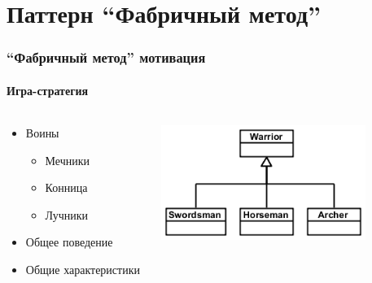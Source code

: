 \documentclass{../cscslides}
\begin{document}
    \section{Паттерн ``Фабричный метод''}

    \begin{frame}
        \frametitle{``Фабричный метод'' мотивация}
        \framesubtitle{Игра-стратегия}
        \begin{columns}
            \begin{column}{0.5\textwidth}
                \begin{itemize}
                    \item Воины
                    \begin{itemize}
                        \item Мечники
                        \item Конница
                        \item Лучники
                    \end{itemize}
                    \item Общее поведение
                    \item Общие характеристики
                \end{itemize}
            \end{column}
            \begin{column}{0.5\textwidth}
                \begin{center}
                    \includegraphics[width=0.8\textwidth]{warriors.png}
                \end{center}
            \end{column}
        \end{columns}
    \end{frame}
\end{document}
